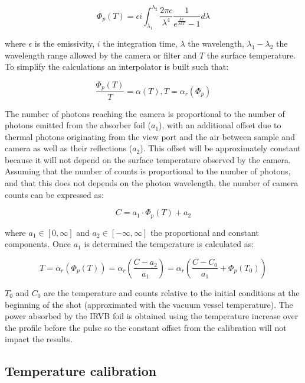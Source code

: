 \begin{equation}
{\Phi}_p (T) = \epsilon i \int_{ {\lambda}_1 }^{ {\lambda}_2 } {\frac{2 \pi c } { {\lambda}^4 } \frac {1} { e^{\frac {hc} {\lambda k T}} -1} {d \lambda} }
\label{eq:BBphotons1}
\end{equation}

where $\epsilon$ is the emissivity, $i$ the integration time, $\lambda$ the wavelength, $\lambda_1-\lambda_2$ the wavelength range allowed by the camera or filter and $T$ the surface temperature.
To simplify the calculations an interpolator is built such that:

\begin{equation}
\frac {{\Phi}_p (T)} {T} = \alpha (T) , T = {\alpha}_r ({\Phi}_p)
\label{eq:BBphotons2}
\end{equation}

The number of photons reaching the camera is proportional to the number of photons emitted from the absorber foil ($a_1$), with an additional offset due to thermal photons originating from the view port and the air between sample and camera as well as their reflections ($a_2$). This offset will be approximately constant because it will not depend on the surface temperature observed by the camera.
Assuming that the number of counts is proportional to the number of photons, and that this does not depends on the photon wavelength, the number of camera counts can be expressed as:

\begin{equation}
C = a_1 \cdot {\Phi}_p (T) + a_2
\label{eq:BBphotons3}
\end{equation}

where $a_1\in[0,\infty]$ and $a_2\in[-\infty,\infty]$ the proportional and constant components. Once $a_1$ is determined the temperature is calculated as:

\begin{equation}
T = {\alpha}_r ( {\Phi}_p(T)) = {\alpha}_r \left (\frac {C - a_2} {a_1} \right ) = {\alpha}_r \left (\frac {C - C_0} {a_1} + {\Phi}_p (T_0) \right )
\label{eq:BBphotons4}
\end{equation}

$T_0$ and $C_0$ are the temperature and counts relative to the initial conditions at the beginning of the shot (approximated with the vacuum vessel temperature). The power absorbed by the IRVB foil is obtained using the temperature increase over the profile before the pulse so the constant offset from the calibration will not impact the results.
\subsection{Temperature calibration}\label{Temperature calibration}

